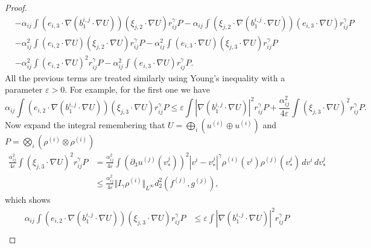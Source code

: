 \documentclass[10pt,oneside]{amsart}
\numberwithin{equation}{section}
\numberwithin{definition}{section}
\numberwithin{theorem}{section}
\numberwithin{lemma}{section}
\begin{document}
\begin{proof}
\begin{align*}
    & -\alpha_{ij}\int\left(e_{i,3}\cdot\nabla\left(b_{1}^{i,j}\cdot\nabla U\right)\right)\left(\xi_{j,2}\cdot\nabla U\right)r_{ij}^{\gamma}P
    -\alpha_{ij}\int\left(\xi_{j,2}\cdot\nabla\left(b_{1}^{i,j}\cdot\nabla U\right)\right)\left(e_{i,3}\cdot\nabla U\right)r_{ij}^{\gamma}P\\
    & -\alpha_{ij}^{2}\int\left(e_{i,2}\cdot\nabla U\right)\left(\xi_{j,2}\cdot\nabla U\right)r_{ij}^{\gamma}P
    -\alpha_{ij}^{2}\int\left(e_{i,3}\cdot\nabla U\right)\left(\xi_{j,3}\cdot\nabla U\right)r_{ij}^{\gamma}P\\
    & -\alpha_{ij}^{2}\int\left(e_{i,2}\cdot\nabla U\right)^{2}r_{ij}^{\gamma}P
    -\alpha_{ij}^{2}\int\left(e_{i,3}\cdot\nabla U\right)r_{ij}^{\gamma}P.
  \end{align*}
  All the previous terms are treated similarly using Young's inequality with a parameter $\varepsilon>0$. For example, for the first one we have
  \begin{equation*}
    \alpha_{ij}\int\left(e_{i,2}\cdot\nabla\left(b_{1}^{i,j}\cdot\nabla U\right)\right)\left(\xi_{j,3}\cdot\nabla U\right)r_{ij}^{\gamma}P\leq\varepsilon\int\left|\nabla\left(b_{1}^{i,j}\cdot\nabla U\right)\right|^{2}r_{ij}^{\gamma}P+\frac{\alpha_{ij}^{2}}{4\varepsilon}\int\left(\xi_{j,3}\cdot\nabla U\right)^{2}r_{ij}^{\gamma}P.
  \end{equation*}
  Now expand the integral remembering that $U=\bigoplus_{i}(u^{(i)}\oplus u^{(i)})$ and $P=\bigotimes_{i}(\rho^{(i)}\otimes\rho^{(i)})$
  \begin{align*}
    \frac{\alpha_{ij}^{2}}{4\varepsilon}\int\left(\xi_{j,3}\cdot\nabla U\right)^{2}r_{ij}^{\gamma}P &
    =\frac{\alpha_{ij}^{2}}{4\varepsilon}\int\left(\partial_{3}u^{(j)}(v^{j}_*)\right)^{2}|v^{i}-v_*^{j}|^{\gamma}\rho^{(i)}(v^{i})\rho^{(j)}(v_*^{j})\,dv^{i}\,dv_*^{j}	\\
    & \leq\frac{\alpha_{ij}^{2}}{4\varepsilon}\Vert I_{\gamma}\rho^{(i)}\Vert _{L^{\infty}}d_{2}^{2}(f^{(j)},g^{(j)}),
  \end{align*}
  which shows
  \begin{align*}
    \alpha_{ij}\int\left(e_{i,2}\cdot\nabla\left(b_{1}^{i,j}\cdot\nabla U\right)\right)\left(\xi_{j,3}\cdot\nabla U\right)r_{ij}^{\gamma}P &
    \leq \varepsilon\int\left|\nabla\left(b_{1}^{i,j}\cdot\nabla U\right)\right|^{2}r_{ij}^{\gamma}P	\\

\end{align*}
\end{proof}
\end{document}
